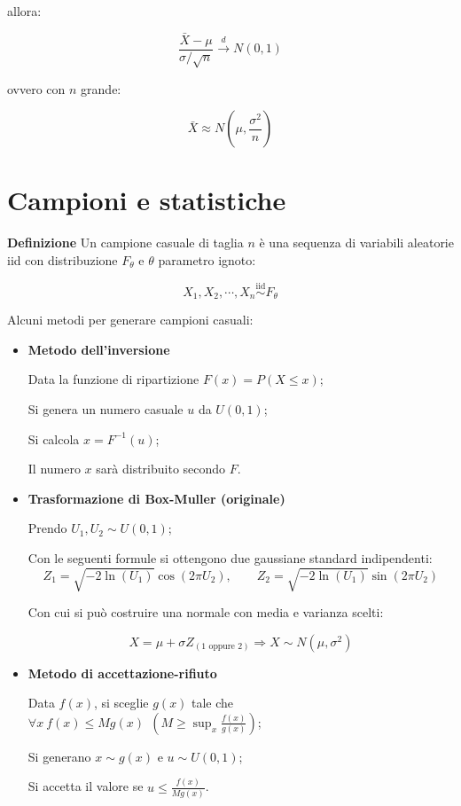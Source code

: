 \documentclass{article}
\newcommand{\df}{\noindent\textbf{Definizione} }
\begin{document}
allora:

\[
\boxed{
\frac{\bar X-\mu}{\sigma/\sqrt n}
\overset{d}{\longrightarrow}
N(0,1)
}
\]

ovvero con $n$ grande:

\[
\boxed{
\bar X
\approx
N\left(
\mu,\frac{\sigma^2}{n}
\right)
}
\]



\section{Campioni e statistiche}

\df Un campione casuale di taglia $n$ è una sequenza di variabili aleatorie iid con distribuzione $F_\theta$ e $\theta$ parametro ignoto:

$$X_1,X_2,\cdots, X_n\stackrel{\mathrm{iid}}{\sim}F_\theta$$\newline

Alcuni metodi per generare campioni casuali:
\begin{itemize}
    \item \textbf{Metodo dell'inversione}

    Data la funzione di ripartizione $F(x)=P(X\leq x)$;
    
    Si genera un numero casuale $u$ da $U(0,1)$;
    
    Si calcola $x=F^{-1}(u)$;

    Il numero $x$ sarà distribuito secondo $F$.

    \item \textbf{Trasformazione di Box-Muller (originale)}

    Prendo $U_1,U_2\sim U(0,1)$;

    Con le seguenti formule si ottengono due gaussiane standard indipendenti:
    \[
    Z_1=\sqrt{-2\ln{(U_1)}}\cos(2\pi U_2),\qquad
    Z_2=\sqrt{-2\ln{(U_1)}}\sin(2\pi U_2)
    \]
    
    Con cui si può costruire una normale con media e varianza scelti:
    
    \[
    X=\mu+\sigma Z_{(1 \text{ oppure } 2)}\Rightarrow X\sim N(\mu,\sigma^2)
    \]

    \item \textbf{Metodo di accettazione-rifiuto}

    Data $f(x)$, si sceglie $g(x)$ tale che $\forall x\ f(x)\leq M g(x)\ \ (M\geq\sup_x\frac{f(x)}{g(x)})$;
    
    Si generano $x\sim g(x)$ e $ u\sim U(0,1)$;
    
    Si accetta il valore se $u\leq \frac{f(x)}{M g(x)}$.\newline

\end{itemize}
\end{document}
